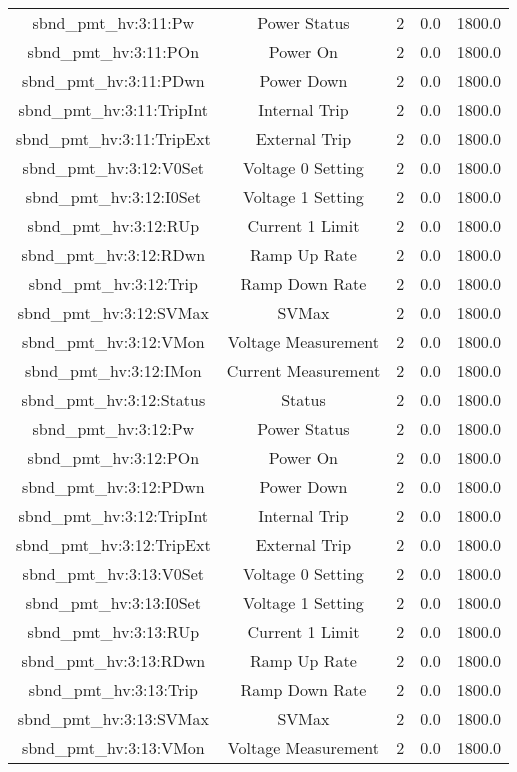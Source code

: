 \begin{table}[ptb]
\begin{tabular}{c | c c c c}
sbnd_pmt_hv:3:11:Pw & Power Status & 2 & 0.0 & 1800.0\\ 
sbnd_pmt_hv:3:11:POn & Power On & 2 & 0.0 & 1800.0\\ 
sbnd_pmt_hv:3:11:PDwn & Power Down & 2 & 0.0 & 1800.0\\ 
sbnd_pmt_hv:3:11:TripInt & Internal Trip & 2 & 0.0 & 1800.0\\ 
sbnd_pmt_hv:3:11:TripExt & External Trip & 2 & 0.0 & 1800.0\\ 
sbnd_pmt_hv:3:12:V0Set & Voltage 0 Setting & 2 & 0.0 & 1800.0\\ 
sbnd_pmt_hv:3:12:I0Set & Voltage 1 Setting & 2 & 0.0 & 1800.0\\ 
sbnd_pmt_hv:3:12:RUp & Current 1 Limit & 2 & 0.0 & 1800.0\\ 
sbnd_pmt_hv:3:12:RDwn & Ramp Up Rate & 2 & 0.0 & 1800.0\\ 
sbnd_pmt_hv:3:12:Trip & Ramp Down Rate & 2 & 0.0 & 1800.0\\ 
sbnd_pmt_hv:3:12:SVMax & SVMax & 2 & 0.0 & 1800.0\\ 
sbnd_pmt_hv:3:12:VMon & Voltage Measurement & 2 & 0.0 & 1800.0\\ 
sbnd_pmt_hv:3:12:IMon & Current Measurement & 2 & 0.0 & 1800.0\\ 
sbnd_pmt_hv:3:12:Status & Status & 2 & 0.0 & 1800.0\\ 
sbnd_pmt_hv:3:12:Pw & Power Status & 2 & 0.0 & 1800.0\\ 
sbnd_pmt_hv:3:12:POn & Power On & 2 & 0.0 & 1800.0\\ 
sbnd_pmt_hv:3:12:PDwn & Power Down & 2 & 0.0 & 1800.0\\ 
sbnd_pmt_hv:3:12:TripInt & Internal Trip & 2 & 0.0 & 1800.0\\ 
sbnd_pmt_hv:3:12:TripExt & External Trip & 2 & 0.0 & 1800.0\\ 
sbnd_pmt_hv:3:13:V0Set & Voltage 0 Setting & 2 & 0.0 & 1800.0\\ 
sbnd_pmt_hv:3:13:I0Set & Voltage 1 Setting & 2 & 0.0 & 1800.0\\ 
sbnd_pmt_hv:3:13:RUp & Current 1 Limit & 2 & 0.0 & 1800.0\\ 
sbnd_pmt_hv:3:13:RDwn & Ramp Up Rate & 2 & 0.0 & 1800.0\\ 
sbnd_pmt_hv:3:13:Trip & Ramp Down Rate & 2 & 0.0 & 1800.0\\ 
sbnd_pmt_hv:3:13:SVMax & SVMax & 2 & 0.0 & 1800.0\\ 
sbnd_pmt_hv:3:13:VMon & Voltage Measurement & 2 & 0.0 & 1800.0\\ 

\end{tabular}
\end{table}
